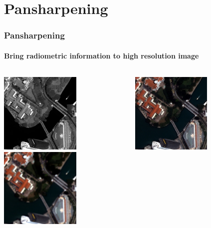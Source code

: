 \documentclass[compress]{beamer}
\begin{document}
\section{Pansharpening}

\begin{frame}
  \frametitle{Pansharpening}
  \framesubtitle{Bring radiometric information to high resolution image}
\centering
\begin{columns}
\begin{column}{0.45\textwidth}
 \includegraphics[width=0.6\textwidth]{panSharp-pan-extract.jpg}\\
 \includegraphics[width=0.6\textwidth]{panSharp-xs-extract.jpg}
\end{column}
\begin{column}{0.45\textwidth}
 \includegraphics[width=0.6\textwidth]{panSharp-extract.jpg}

\end{column}
\end{columns}
\end{frame}
\end{document}
